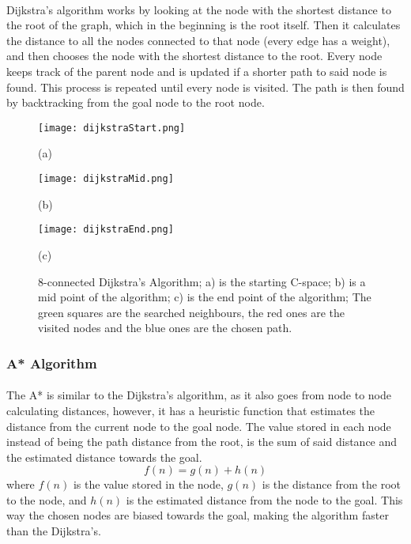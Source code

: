 \paragraph{}Dijkstra’s algorithm works by looking at the node with the shortest distance to the root of the graph, which
in the beginning is the root itself. Then it calculates the distance to all the nodes connected to that node (every edge
 has a weight), and then chooses the node with the shortest distance to the root. Every node keeps track of the 
parent node and is updated if a shorter path to said node is found. This process is repeated until
every node is visited. The path is then found by backtracking from the goal node to the root node. 
\begin{figure}[htbp]
    \centering
    \begin{minipage}[b]{0.3\textwidth}
        \centering
        \texttt{[image: dijkstraStart.png]} %
        \caption{(a)}
    \end{minipage}
    \begin{minipage}[b]{0.3\textwidth}
        \centering
        \texttt{[image: dijkstraMid.png]} %
        \caption{(b)}
    \end{minipage}
    \begin{minipage}[b]{0.3\textwidth}
        \centering
        \texttt{[image: dijkstraEnd.png]} %
        \caption{(c)}
    \end{minipage}
    \caption{8-connected Dijkstra's Algorithm; a) is the starting C-space; b) is a mid point of the algorithm; c) is the end point of the algorithm; The green squares are the searched neighbours, the red ones are the visited nodes and the blue ones are the chosen path.}
    \label{fig:Dijkstra}
\end{figure}
\subsubsection{A* Algorithm}
\label{subsubsec:A*}
\paragraph{}The A* is similar to the Dijkstra's algorithm, as it also goes from node to node calculating distances, however, 
it has a heuristic function that estimates the distance from the current node to the goal node. The value stored in each node 
instead of being the path distance from the root, is the sum of said distance and the estimated distance towards the goal.
\begin{equation}
    f(n) = g(n) + h(n)
\end{equation}
where $f(n)$ is the value stored in the node, $g(n)$ is the distance from the root to the node, and $h(n)$ is the estimated 
distance from the node to the goal. This way the chosen nodes are biased towards the goal, making the algorithm faster than 
the Dijkstra's.

